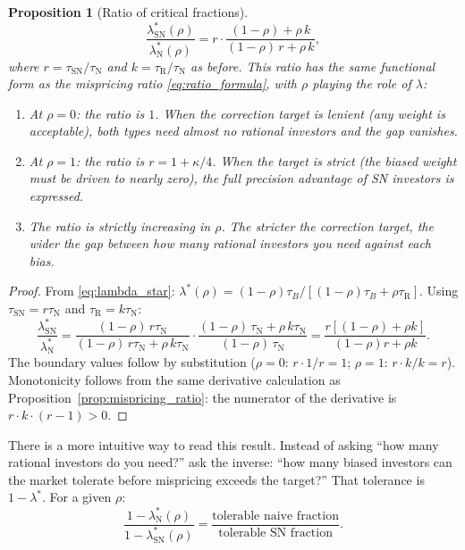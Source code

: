 \documentclass[12pt]{article}
\theoremstyle{plain}
\newtheorem{proposition}{Proposition}
\theoremstyle{definition}
\newcommand{\R}{\mathrm{R}}
\newcommand{\SN}{\mathrm{SN}}
\newcommand{\N}{\mathrm{N}}
\begin{document}
\begin{proposition}[Ratio of critical fractions]
\label{prop:lambda_ratio}
\begin{equation}
\frac{\lambda^*_\SN(\rho)}{\lambda^*_\N(\rho)} = r \cdot \frac{(1-\rho) + \rho\,k}{(1-\rho)\,r + \rho\,k},
\label{eq:lambda_ratio}
\end{equation}
where $r = \tau_\SN/\tau_\N$ and $k = \tau_\R/\tau_\N$ as before. This ratio has the same functional form as the mispricing ratio \eqref{eq:ratio_formula}, with $\rho$ playing the role of $\lambda$:
\begin{enumerate}[nosep]
\item At $\rho = 0$: the ratio is $1$. When the correction target is lenient (any weight is acceptable), both types need almost no rational investors and the gap vanishes.
\item At $\rho = 1$: the ratio is $r = 1 + \kappa/4$. When the target is strict (the biased weight must be driven to nearly zero), the full precision advantage of SN investors is expressed.
\item The ratio is strictly increasing in $\rho$. The stricter the correction target, the wider the gap between how many rational investors you need against each bias.
\end{enumerate}
\end{proposition}

\begin{proof}
From \eqref{eq:lambda_star}: $\lambda^*(\rho) = (1-\rho)\tau_B / [(1-\rho)\tau_B + \rho\tau_\R]$. Using $\tau_\SN = r\tau_\N$ and $\tau_\R = k\tau_\N$:
\[
\frac{\lambda^*_\SN}{\lambda^*_\N} = \frac{(1-\rho)\,r\tau_\N}{(1-\rho)\,r\tau_\N + \rho\,k\tau_\N} \cdot \frac{(1-\rho)\,\tau_\N + \rho\,k\tau_\N}{(1-\rho)\,\tau_\N} = \frac{r[(1-\rho) + \rho k]}{(1-\rho)r + \rho k}.
\]
The boundary values follow by substitution ($\rho = 0$: $r \cdot 1/r = 1$; $\rho = 1$: $r \cdot k/k = r$). Monotonicity follows from the same derivative calculation as Proposition~\ref{prop:mispricing_ratio}: the numerator of the derivative is $r \cdot k \cdot (r-1) > 0$.
\end{proof}

There is a more intuitive way to read this result. Instead of asking ``how many rational investors do you need?'' ask the inverse: ``how many biased investors can the market tolerate before mispricing exceeds the target?'' That tolerance is $1 - \lambda^*$. For a given $\rho$:
\begin{equation}
\frac{1 - \lambda^*_\N(\rho)}{1 - \lambda^*_\SN(\rho)} = \frac{\text{tolerable naive fraction}}{\text{tolerable SN fraction}}.
\label{eq:tolerance_ratio}
\end{equation}
\end{document}
